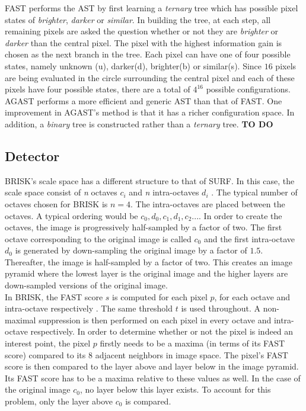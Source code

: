 \documentclass{report}
\begin{document}
FAST performs the AST by first learning a \textit{ternary} tree which has possible pixel states of \textit{brighter}, \textit{darker} or \textit{similar}. In building the tree, at each step, all remaining pixels are asked the question whether or not they are \textit{brighter} or \textit{darker} than the central pixel. The pixel with the highest information gain is chosen as the next branch in the tree. Each pixel can have one of four possible states, namely unknown (u), darker(d), brighter(b) or similar(s). Since $16$ pixels are being evaluated in the circle surrounding the central pixel and each of these pixels have four possible states, there are a total of $4^{16}$ possible configurations. \\

AGAST performs a more efficient and generic AST than that of FAST. One improvement in AGAST's method is that it has a richer configuration space. In addition, a \textit{binary} tree is constructed rather than a \textit{ternary} tree. \textbf{TO DO}\\

\subsection{Detector}
\label{briskDetect}
BRISK's scale space has a different structure to that of SURF. In this case, the scale space consist of \textit{n} octaves \textit{$c_i$} and \textit{n} intra-octaves \textit{$d_i$} \cite{Leutenegger2011}. The typical number of octaves chosen for BRISK is $n=4$. The intra-octaves are placed between the octaves. A typical ordering would be $c_0, d_0, c_1, d_1, c_2...$. In order to create the octaves, the image is progressively half-sampled by a factor of two. The first octave corresponding to the original image is called $c_0$ and the first intra-octave $d_0$ is generated by down-sampling the original image by a factor of $1.5$. Thereafter, the image is half-sampled by a factor of two. This creates an image pyramid where the lowest layer is the original image and the higher layers are down-sampled versions of the original image.\\

In BRISK, the FAST score $s$ is computed for each pixel $p$, for each octave and intra-octave respectively \cite{Leutenegger2011}. The same threshold $t$ is used throughout. A non-maximal suppression is then performed on each pixel in every octave and intra-octave respectively. In order to determine whether or not the pixel is indeed an interest point, the pixel $p$ firstly needs to be a maxima (in terms of its FAST score) compared to its $8$ adjacent neighbors in image space. The pixel's FAST score is then compared to the layer above and layer below in the image pyramid. Its FAST score has to be a maxima relative to these values as well. In the case of the original image $c_0$, no layer below this layer exists. To account for this problem, only the layer above $c_0$ is compared.\\
\end{document}
